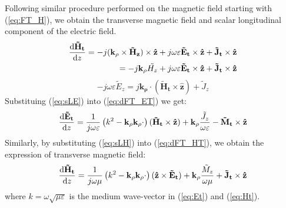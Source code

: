 \documentclass[11pt]{article}
\renewcommand{\v}[1]{\mathbf{#1}} %
\newcommand{\ti}[1]{\tilde{#1}} %
\renewcommand{\O}{\omega}  %
\newcommand{\E}{\varepsilon}  %
\renewcommand{\u}{\mu}  %
\newcommand{\p}{\rho}  %
\newcommand{\x}{\times}  %
\renewcommand{\^}{\hat}  %
\begin{document}
  Following similar procedure performed on the magnetic field starting with (\ref{eq:FT_H}), we obtain the transverse magnetic field and scalar longitudinal component of the electric field.
  \begin{equation}
    \begin{split}
      \dv{\v{\ti{H}_t}}{z} = -j (\v{k_{\p}} \x \v{\ti{H}_z}) \x \v{\^{z}}
      + j \O \E \v{\ti{E}_t} \x \v{\^{z}} +
      \v{\ti{J}_t} \x \v{\^{z}} \\
      = -j \v{k_{\p}} \ti{{H}_z} + j \O \E \v{\ti{E}_t} \x \v{\^{z}}  +
      \v{\ti{J}_t} \x \v{\^{z}}
    \end{split}
    \label{eq:dFT_HT}
  \end{equation}
  \begin{equation}
    -j \O \E \ti{E}_z =
    j \v{k_{\p}} \cdot (\v{\ti{H}_t} \x \v{\^{z}}) + {\ti{J}_z}
    \label{eq:sLE}
  \end{equation}
  Substituing (\ref{eq:sLE}) into (\ref{eq:dFT_ET}) we get:
  \begin{equation}
    \dv{\v{\ti{E}_t}}{z} =
    \frac{1}{j \O \E} \left( k^2 - \v{k_{\p}}\v{k_{\p}} \cdot \right) (\v{\ti{H}_t} \x \v{\^{z}}) + \v{k_{\p}} \frac{\ti{J}_z}{\O \E} - \v{\ti{M}_t}
    \x \v{\^{z}}
    \label{eq:Et}
  \end{equation}
  Similarly, by substituting (\ref{eq:sLH}) into (\ref{eq:dFT_HT}), we obtain the expression of transverse magnetic field:
  \begin{equation}
    \dv{\v{\ti{H}_t}}{z} =
    \frac{1}{j \O \u} \left( k^2 - \v{k_{\p}}\v{k_{\p}} \cdot \right) (\v{\^{z}} \x \v{\ti{E}_t}) + \v{k_{\p}} \frac{\ti{M}_z}{\O \u} + \v{\ti{J}_t}
    \x \v{\^{z}}
    \label{eq:Ht}
  \end{equation}
  where $k = \O \sqrt{\u \E}$ is the medium wave-vector in (\ref{eq:Et}) and (\ref{eq:Ht}).
\end{document}
